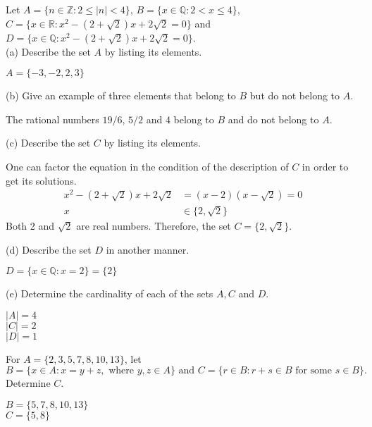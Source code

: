 \documentclass[12pt]{article}
\newcommand{\Z}{\mathbb{Z}}
\newenvironment{problem}[2][Problem]{\begin{trivlist}
		\item[\hskip \labelsep {\bfseries #1}\hskip \labelsep {\bfseries #2.}]}{\end{trivlist}}
\newenvironment{solution}[2][Solution]{\begin{trivlist}
		\item[\hskip \labelsep {\bfseries #1}\hskip \labelsep {\bfseries #2.}]}{\end{trivlist}}
\begin{document}
	\begin{problem}{8}
		Let $A=\{n \in \Z:2\leq |n|<4\}$, $B=\{x\in \mathbb{Q}:2<x\leq 4\}$, $C=\{x \in \mathbb{R}:x^{2}-(2+\sqrt{2})x+2\sqrt{2}=0\}$ and $D=\{x \in \mathbb{Q}: x^{2}-(2+\sqrt{2})x+2\sqrt{2}=0\}$.\\
		
		(a) Describe the set $A$ by listing its elements.
		\begin{solution}{a}
			$A=\{-3,-2,2,3\}$
		\end{solution}
		(b) Give an example of three elements that belong to $B$ but do not belong to $A$.
		\begin{solution}{b}
			The rational numbers $19/6$, $5/2$ and $4$ belong to $B$ and do not belong to $A$.
		\end{solution}
		(c) Describe the set $C$ by listing its elements.
		\begin{solution}{c}
			One can factor the equation in the condition of the description of $C$ in order to get its solutions.
			\begin{align*}
				x^{2}-(2+\sqrt{2})x+2\sqrt{2}& =  (x-2)(x-\sqrt{2}) = 0\\
						x &\in \{2,\sqrt{2}\}
			\end{align*}
			Both 2 and $\sqrt{2}$ are real numbers. Therefore, the set $C=\{2,\sqrt{2}\}$.
		\end{solution}
		(d) Describe the set $D$ in another manner.
		\begin{solution}{d}
			$D=\{x\in \mathbb{Q}:x=2\}=\{2\}$
		\end{solution}
		(e) Determine the cardinality of each of the sets $A,C$ and $D$.
		\begin{solution}{e} 
			$|A|=4$\\$|C|=2$\\$|D|=1$
		\end{solution}
	\end{problem}

	\begin{problem}{9}
		For $A=\{2,3,5,7,8,10,13\}$, let
		\begin{equation*}
			B=\{x \in A:x=y+z, \text{ where }y,z\in A\} \text{ and } C=\{r\in B: r+s\in B \text{ for some } s\in B\}.
		\end{equation*}
	Determine $C$.
	\begin{solution}{}
		$B=\{5,7,8,10,13\}$\\
		$C=\{5,8\}$
	\end{solution}
	\end{problem}
\end{document}

